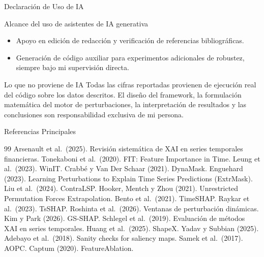 \documentclass{beamer}
\begin{document}
\begin{frame}{Declaración de Uso de IA}
    \begin{block}{Alcance del uso de asistentes de IA generativa}
        \begin{itemize}
            \item Apoyo en edición de redacción y verificación de
            referencias bibliográficas.
            \item Generación de código auxiliar para experimentos
            adicionales de robustez, siempre bajo mi supervisión directa.
        \end{itemize}
    \end{block}
    \begin{alertblock}{Lo que no proviene de IA}
        Todas las cifras reportadas provienen de ejecución real del
        código sobre los datos descritos. El diseño del framework,
        la formulación matemática del motor de perturbaciones, la
        interpretación de resultados y las conclusiones son
        responsabilidad exclusiva de mi persona.
    \end{alertblock}
\end{frame}

\begin{frame}{Referencias Principales}
    \tiny
    \begin{thebibliography}{99}
         Arsenault et al.\ (2025). Revisión
        sistemática de XAI en series temporales financieras.
         Tonekaboni et al.\ (2020). FIT:
        Feature Importance in Time.
         Leung et al.\ (2023). WinIT.
         Crabbé y Van Der Schaar (2021). DynaMask.
         Enguehard (2023). Learning
        Perturbations to Explain Time Series Predictions (ExtrMask).
         Liu et al.\ (2024). ContraLSP.
         Hooker, Mentch y Zhou (2021). Unrestricted
        Permutation Forces Extrapolation.
         Bento et al.\ (2021). TimeSHAP.
         Raykar et al.\ (2023). TsSHAP.
         Roshinta et al.\ (2026). Ventanas de
        perturbación dinámicas.
         Kim y Park (2026). GS-SHAP.
         Schlegel et al.\ (2019). Evaluación de
        métodos XAI en series temporales.
         Huang et al.\ (2025). ShapeX.
         Yadav y Subbian (2025).
         Adebayo et al.\ (2018). Sanity checks
        for saliency maps.
         Samek et al.\ (2017). AOPC.
         Captum (2020). FeatureAblation.
    \end{thebibliography}
\end{frame}
\end{document}
